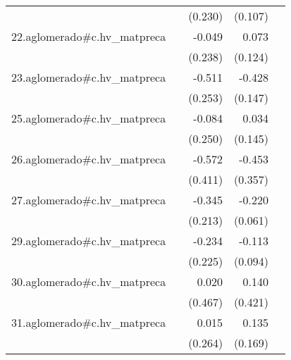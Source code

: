 {\begin{longtable}{l*{4}{D{.}{.}{-1}}}
            &                     &     (0.230)         &     (0.107)         &                     \\
\addlinespace
22.aglomerado#c.hv\_matpreca&                     &      -0.049         &       0.073         &                     \\
            &                     &     (0.238)         &     (0.124)         &                     \\
\addlinespace
23.aglomerado#c.hv\_matpreca&                     &      -0.511\sym{*}  &      -0.428\sym{**} &                     \\
            &                     &     (0.253)         &     (0.147)         &                     \\
\addlinespace
25.aglomerado#c.hv\_matpreca&                     &      -0.084         &       0.034         &                     \\
            &                     &     (0.250)         &     (0.145)         &                     \\
\addlinespace
26.aglomerado#c.hv\_matpreca&                     &      -0.572         &      -0.453         &                     \\
            &                     &     (0.411)         &     (0.357)         &                     \\
\addlinespace
27.aglomerado#c.hv\_matpreca&                     &      -0.345         &      -0.220\sym{***}&                     \\
            &                     &     (0.213)         &     (0.061)         &                     \\
\addlinespace
29.aglomerado#c.hv\_matpreca&                     &      -0.234         &      -0.113         &                     \\
            &                     &     (0.225)         &     (0.094)         &                     \\
\addlinespace
30.aglomerado#c.hv\_matpreca&                     &       0.020         &       0.140         &                     \\
            &                     &     (0.467)         &     (0.421)         &                     \\
\addlinespace
31.aglomerado#c.hv\_matpreca&                     &       0.015         &       0.135         &                     \\
            &                     &     (0.264)         &     (0.169)         &                     \\

\end{longtable}}
